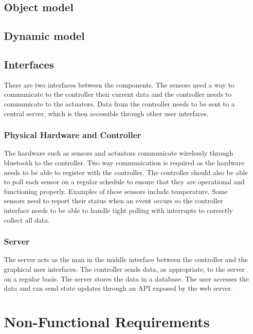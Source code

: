 \documentclass{report}
\begin{document}
\section{Object model}



\section{Dynamic model}



\section{Interfaces}
There are two interfaces between the components. The sensors need a way to
communicate to the controller their current data and the controller needs to
communicate to the actuators. Data from the controller needs to be sent to a
central server, which is then accessible through other user interfaces.

\subsection{Physical Hardware and Controller}
The hardware such as sensors and actuators communicate wirelessly through
bluetooth to the controller. Two way communication is required as the hardware
needs to be able to register with the controller. The controller should also be
able to poll each sensor on a regular schedule to ensure that they are
operational and functioning properly. Examples of these sensors include
temperature, Some sensors need to report their status when an event occurs so
the controller interface needs to be able to handle tight polling with
interrupts to correctly collect all data.

\subsection{Server}
The server acts as the man in the middle interface between the controller and
the graphical user interfaces. The controller sends data, as appropriate, to
the server on a regular basis. The server stores the data in a database. The
user accesses the data and can send state updates through an API exposed by the
web server. 

\chapter{Non-Functional Requirements}
\end{document}
